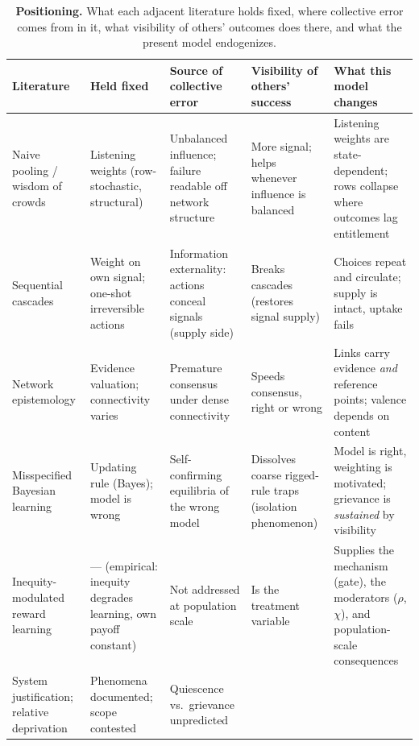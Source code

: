 \documentclass[11pt]{article}
\newcommand{\1}{\mathbf{1}}
\begin{document}
\begin{table}[H]
\centering\small
\caption{\textbf{Positioning.} What each adjacent literature holds fixed, where collective
error comes from in it, what visibility of others' outcomes does there, and what the present
model endogenizes.}
\label{tab:positioning}
\setlength{\tabcolsep}{4pt}\begin{tabular}{@{}p{3.0cm}p{2.8cm}p{3.1cm}p{2.6cm}p{2.9cm}@{}}
\toprule
\textbf{Literature} & \textbf{Held fixed} & \textbf{Source of collective error} & \textbf{Visibility of others' success} & \textbf{What this model changes} \\
\midrule
Naive pooling / wisdom of crowds\cite{DeGroot1974,GolubJackson2010} &
Listening weights (row-stochastic, structural) &
Unbalanced influence; failure readable off network structure &
More signal; helps whenever influence is balanced &
Listening weights are state-dependent; rows collapse where outcomes lag entitlement \\
\addlinespace
Sequential cascades\cite{Banerjee1992,BikhchandaniHirshleiferWelch1992} &
Weight on own signal; one-shot irreversible actions &
Information externality: actions conceal signals (supply side) &
Breaks cascades (restores signal supply) &
Choices repeat and circulate; supply is intact, uptake fails \\
\addlinespace
Network epistemology\cite{Zollman2007} &
Evidence valuation; connectivity varies &
Premature consensus under dense connectivity &
Speeds consensus, right or wrong &
Links carry evidence \emph{and} reference points; valence depends on content \\
\addlinespace
Misspecified Bayesian learning\cite{HeidhuesKoszegiStrack2018,EspondaPouzo2016,BohrenHauser2021,FrickIijimaIshii2020} &
Updating rule (Bayes); model is wrong &
Self-confirming equilibria of the wrong model &
Dissolves coarse rigged-rule traps (isolation phenomenon) &
Model is right, weighting is motivated; grievance is \emph{sustained} by visibility \\
\addlinespace
Inequity-modulated reward learning\cite{HamJenkins2025,FehrSchmidt1999} &
--- (empirical: inequity degrades learning, own payoff constant) &
Not addressed at population scale &
Is the treatment variable &
Supplies the mechanism (gate), the moderators ($\rho$, $\chi$), and population-scale consequences \\
\addlinespace
System justification; relative deprivation\cite{JostBanajiNosek2004,Runciman1966,Gurr1970,SmithPettigrew2012} &
Phenomena documented; scope contested &
Quiescence vs.\ grievance unpredicted &

\end{tabular}
\end{table}
\end{document}
